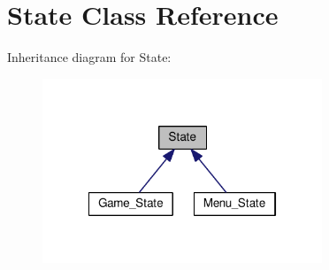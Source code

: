 \hypertarget{classState}{\section{State Class Reference}
\label{classState}
}


Inheritance diagram for State\+:\nopagebreak
\begin{figure}[H]
\begin{center}
\leavevmode
\includegraphics[width=237pt]{classState__inherit__graph}
\end{center}
\end{figure}
